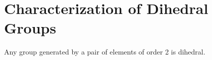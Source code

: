\section{Characterization of Dihedral Groups}

\begin{theorem}
	Any group generated by a pair of elements of order 2 is dihedral.
\end{theorem}
